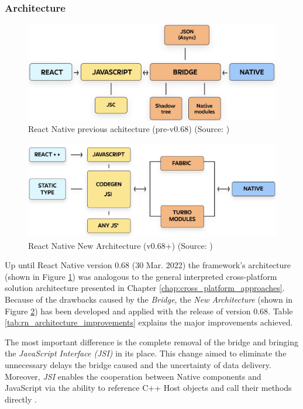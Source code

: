 \subsubsection*{Architecture}

\begin{figure}[h]
    \centering
    \includegraphics[width=.77\textwidth]{img/rn_old_architecture}
    \caption{React Native previous achitecture (pre-v0.68) (Source: \cite{matijevic_rn_rearchitecture})}
    \label{fig:rn_old_architecture}
\end{figure}

\begin{figure}[h]
    \centering
    \includegraphics[width=.77\textwidth]{img/rn_new_architecture}
    \caption{React Native New Architecture (v0.68+) (Source: \cite{matijevic_rn_rearchitecture})}
    \label{fig:rn_new_architecture}
\end{figure}

Up until React Native version 0.68 (30 Mar. 2022) the framework's architecture (shown in Figure \ref{fig:rn_old_architecture}) was analogous to the general interpreted cross-platform solution architecture presented in Chapter \ref{chap:cross_platform_approaches}. Because of the drawbacks caused by the \emph{Bridge}, the \emph{New Architecture} (shown in Figure \ref{fig:rn_new_architecture}) has been developed and applied with the release of version 0.68. Table \ref{tab:rn_architecture_improvements} explains the major improvements achieved.

The most important difference is the complete removal of the bridge and bringing the \emph{JavaScript Interface (JSI)} in its place. This change aimed to eliminate the unnecessary delays the bridge caused and the uncertainty of data delivery. Moreover, \emph{JSI} enables the cooperation between Native components and JavaScript via the ability to reference C++ Host objects and call their methods directly \cite{matijevic_rn_rearchitecture}.

